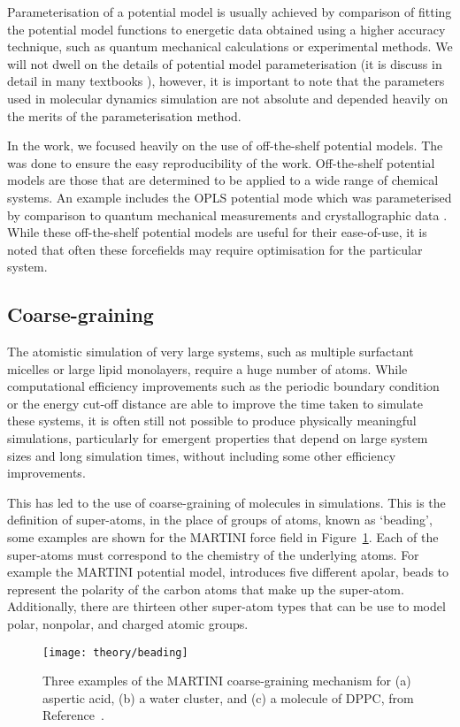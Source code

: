 Parameterisation of a potential model is usually achieved by comparison of fitting the potential model functions to energetic data obtained using a higher accuracy technique, such as quantum mechanical calculations or experimental methods.
We will not dwell on the details of potential model parameterisation (it is discuss in detail in many textbooks \cite{harvey_computational_2018,leach_molecular_1996}), however, it is important to note that the parameters used in molecular dynamics simulation are not absolute and depended heavily on the merits of the parameterisation method.

In the work, we focused heavily on the use of off-the-shelf potential models.
The was done to ensure the easy reproducibility of the work.
Off-the-shelf potential models are those that are determined to be applied to a wide range of chemical systems.
An example includes the OPLS potential mode which was parameterised by comparison to quantum mechanical measurements and crystallographic data \cite{jorgensen_opls_1988}.
While these off-the-shelf potential models are useful for their ease-of-use, it is noted that often these forcefields may require optimisation for the particular system.

\subsection{Coarse-graining}
\label{sec:coarsegraining}
The atomistic simulation of very large systems, such as multiple surfactant micelles or large lipid monolayers, require a huge number of atoms.
While computational efficiency improvements such as the periodic boundary condition or the energy cut-off distance are able to improve the time taken to simulate these systems, it is often still not possible to produce physically meaningful simulations, particularly for emergent properties that depend on large system sizes and long simulation times, without including some other efficiency improvements.

This has led to the use of coarse-graining of molecules in simulations.
This is the definition of super-atoms, in the place of groups of atoms, known as `beading', some examples are shown for the MARTINI force field \cite{marrink_martini_2007} in Figure~\ref{fig:cg}.
Each of the super-atoms must correspond to the chemistry of the underlying atoms.
For example the MARTINI potential model, introduces five different apolar, beads to represent the polarity of the carbon atoms that make up the super-atom.
Additionally, there are thirteen other super-atom types that can be use to model polar, nonpolar, and charged atomic groups.
%
\begin{figure}
    \centering
    \texttt{[image: theory/beading]}
    \caption{Three examples of the MARTINI coarse-graining mechanism for (a) aspertic acid, (b) a water cluster, and (c) a molecule of DPPC, from Reference~\cite{pluhackova_biomembranes_2015}.}
    \label{fig:cg}
\end{figure}
%

